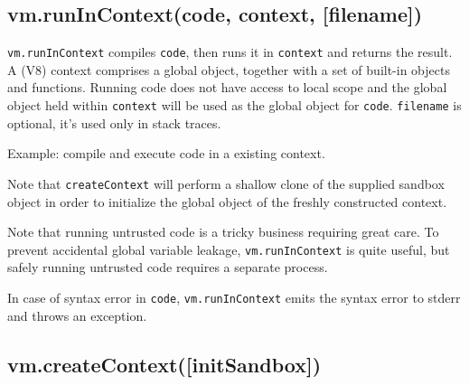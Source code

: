 \subsection{vm.runInContext(code, context, {[}filename{]})}

\texttt{vm.runInContext} compiles \texttt{code}, then runs it in
\texttt{context} and returns the result. A (V8) context comprises a
global object, together with a set of built-in objects and functions.
Running code does not have access to local scope and the global object
held within \texttt{context} will be used as the global object for
\texttt{code}. \texttt{filename} is optional, it's used only in stack
traces.

Example: compile and execute code in a existing context.

\begin{Shaded}
\begin{Highlighting}[]
 \NormalTok{),}
    \NormalTok{),}
      \NormalTok{: }\NormalTok{,}
      \NormalTok{: }
    \NormalTok{\},}

\NormalTok{(}\NormalTok{);}
\NormalTok{(}

\end{Highlighting}
\end{Shaded}

Note that \texttt{createContext} will perform a shallow clone of the
supplied sandbox object in order to initialize the global object of the
freshly constructed context.

Note that running untrusted code is a tricky business requiring great
care. To prevent accidental global variable leakage,
\texttt{vm.runInContext} is quite useful, but safely running untrusted
code requires a separate process.

In case of syntax error in \texttt{code}, \texttt{vm.runInContext} emits
the syntax error to stderr and throws an exception.

\subsection{vm.createContext({[}initSandbox{]})}

